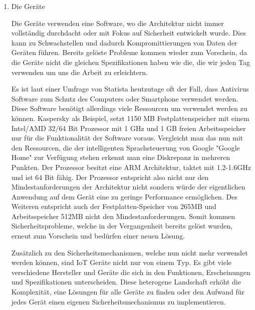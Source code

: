     \begin{enumerate}
        \item Die Geräte
        
        Die Geräte verwenden eine Software, wo die Architektur nicht immer vollständig durchdacht oder mit Fokus auf Sicherheit entwickelt wurde. Dies kann zu Schwachstellen und dadurch Kompromittierungen von Daten der Geräten führen. Bereits gelöste Probleme kommen wieder zum Vorschein, da die Geräte nicht die gleichen Spezifikationen haben wie die, die wir jeden Tag verwenden um uns die Arbeit zu erleichtern. 
    
        Es ist laut einer Umfrage von Statista %
        heutzutage oft der Fall, dass Antivirus Software zum Schutz des Computers oder Smartphone verwendet werden. Diese Software benötigt allerdings viele Ressourcen um verwendet werden zu können.
        Kaspersky %
        als Beispiel, setzt 1150 MB Festplattenspeicher mit einem Intel/AMD 32/64 Bit Prozessor mit 1 GHz und 1 GB freien Arbeitsspeicher nur für die Funktionalität der Software voraus. Vergleicht man das nun mit den Ressourcen, die der intelligenten Sprachsteuerung von Google "Google Home" %
        zur Verfügung stehen erkennt man eine Diskrepanz in mehreren Punkten. Der Prozessor besitzt eine ARM Architektur, taktet mit 1.2-1.6GHz %
        und ist 64 Bit fähig. Der Prozessor entspricht also nicht nur den Mindestanforderungen der Architektur nicht sondern würde der eigentlichen Anwendung auf dem Gerät eine zu geringe Performance ermöglichen. Des Weiteren entspricht auch der Festplatten-Speicher von 265MB und Arbeitsspeicher 512MB nicht den Mindestanforderungen.
        Somit kommen Sicherheitsprobleme, welche in der Vergangenheit bereits gelöst wurden, erneut zum Vorschein und bedürfen einer neuen Lösung.
        
        Zusätzlich zu den Sicherheitsmechanismen, welche nun nicht mehr verwendet werden können, sind \ac{IoT} Geräte nicht nur von einem Typ. Es gibt viele verschiedene Hersteller und Geräte die sich in den Funktionen, Erscheinungen und Spezifikationen unterscheiden. Diese heterogene Landschaft erhöht die Komplexität, eine Lösungen für alle Geräte zu finden oder den Aufwand für jedes Gerät einen eigenen Sicherheitsmechanismus zu implementieren.
        

\end{enumerate}
